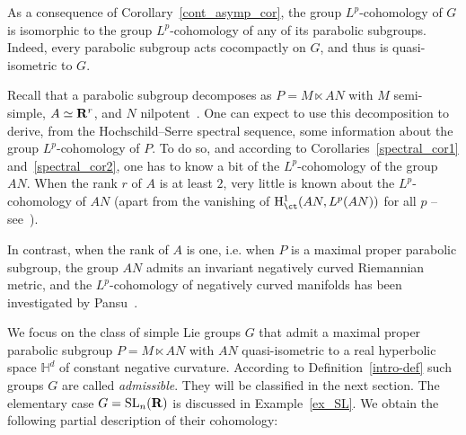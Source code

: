 As a consequence of Corollary~\ref{cont_asymp_cor}, the group $L^p$-cohomology of $G$ is isomorphic to the group $L^p$-cohomology of any of its parabolic subgroups. Indeed, every parabolic subgroup acts cocompactly on $G$, and thus is quasi-isometric to $G$.

Recall that a parabolic subgroup decomposes as $P = M \ltimes AN$ with $M$ semi-simple, $A \simeq {\bf R} ^r$, and $N$ nilpotent~\cite[Proposition~7.83]{Knapp}. One can expect to use this decomposition to derive, from the Hochschild--Serre spectral sequence, some information about the group $L^p$-cohomology of $P$. To do so, and according to Corollaries~\ref{spectral_cor1} and~\ref{spectral_cor2}, one has to know a bit of the $L^p$-cohomology of the group $AN$. When the rank $r$ of $A$ is at least $2$, very little is known about the $L^p$-cohomology of $AN$ (apart from the vanishing of ${\rm H}^1 _{\ct} (AN, L^p(AN))$ for all $p$ -- see~\cite{CT,P2}).

In contrast, when the rank of $A$ is one, i.e. when $P$ is a maximal proper parabolic subgroup, the group $AN$ admits an invariant negatively curved Riemannian metric, and the $L^p$-cohomology of negatively curved manifolds has been investigated by Pansu~\cite{P1,Pa99}.

We focus on the class of simple Lie groups $G$ that admit a maximal proper parabolic subgroup $P = M \ltimes AN$ with $AN$ quasi-isometric to a real hyperbolic space $\mathbb H^d$ of constant negative curvature. According to Definition~\ref{intro-def} such groups $G$ are called \emph{admissible}. They will be classified in the next section. The elementary case \linebreak$G = {\rm SL}_n({\bf R})$ is discussed in Example~\ref{ex_SL}. We obtain the following partial description of their cohomology:

